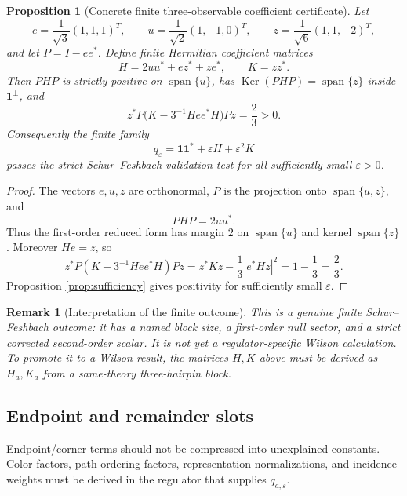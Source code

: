 \documentclass[11pt]{article}
\newtheorem{proposition}[theorem]{Proposition}
\newtheorem{remark}[theorem]{Remark}
\newcommand{\one}{\mathbf 1}
\newcommand{\eps}{\varepsilon}
\newcommand{\Ker}{\operatorname{Ker}}
\newcommand{\Span}{\operatorname{span}}
\begin{document}
\begin{proposition}[Concrete finite three-observable coefficient certificate]
\label{prop:three-observable-certificate}
Let
\[
  e=\frac1{\sqrt3}(1,1,1)^T,\qquad
  u=\frac1{\sqrt2}(1,-1,0)^T,\qquad
  z=\frac1{\sqrt6}(1,1,-2)^T,
\]
and let \(P=I-ee^*\).  Define finite Hermitian coefficient matrices
\[
  H=2uu^*+ez^*+ze^*,
  \qquad
  K=zz^* .
\]
Then \(PHP\) is strictly positive on \(\Span\{u\}\), has \(\Ker(PHP)=\Span\{z\}\) inside \(\one^\perp\), and
\[
  z^*P\bigl(K-3^{-1}Hee^*H\bigr)Pz=\frac23>0.
\]
Consequently the finite family
\[
  q_\eps=\one\one^*+\eps H+\eps^2K
\]
passes the strict Schur--Feshbach validation test for all sufficiently small \(\eps>0\).
\end{proposition}

\begin{proof}
The vectors \(e,u,z\) are orthonormal, \(P\) is the projection onto \(\Span\{u,z\}\), and
\[
  PHP=2uu^*.
\]
Thus the first-order reduced form has margin \(2\) on \(\Span\{u\}\) and kernel \(\Span\{z\}\).  Moreover \(He=z\), so
\[
  z^*P(K-3^{-1}Hee^*H)Pz
  =
  z^*Kz-\frac13|e^*Hz|^2
  =
  1-\frac13
  =
  \frac23.
\]
Proposition \ref{prop:sufficiency} gives positivity for sufficiently small \(\eps\).
\end{proof}

\begin{remark}[Interpretation of the finite outcome]
This is a genuine finite Schur--Feshbach outcome: it has a named block size, a first-order null sector, and a strict corrected second-order scalar.  It is not yet a regulator-specific Wilson calculation.  To promote it to a Wilson result, the matrices \(H,K\) above must be derived as \(H_a,K_a\) from a same-theory three-hairpin block.
\end{remark}

\subsection{Endpoint and remainder slots}

Endpoint/corner terms should not be compressed into unexplained constants.  Color factors, path-ordering factors, representation normalizations, and incidence weights must be derived in the regulator that supplies \(q_{a,\eps}\).
\end{document}
